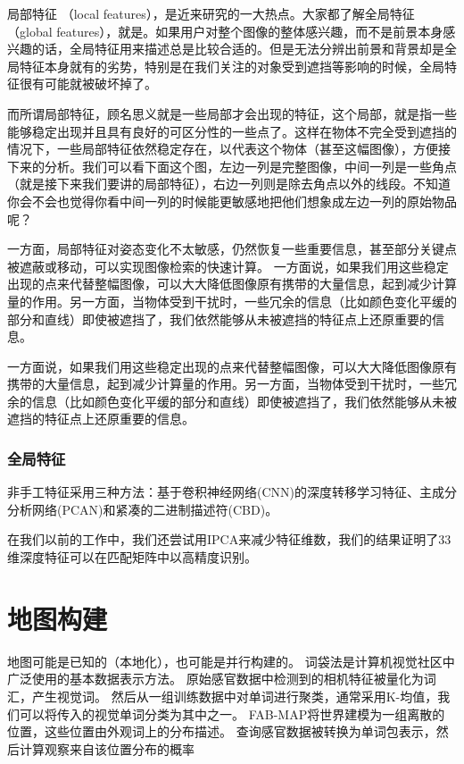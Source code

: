 局部特征 （local features），是近来研究的一大热点。大家都了解全局特征（global features），就是。如果用户对整个图像的整体感兴趣，而不是前景本身感兴趣的话，全局特征用来描述总是比较合适的。但是无法分辨出前景和背景却是全局特征本身就有的劣势，特别是在我们关注的对象受到遮挡等影响的时候，全局特征很有可能就被破坏掉了。


而所谓局部特征，顾名思义就是一些局部才会出现的特征，这个局部，就是指一些能够稳定出现并且具有良好的可区分性的一些点了。这样在物体不完全受到遮挡的情况下，一些局部特征依然稳定存在，以代表这个物体（甚至这幅图像），方便接下来的分析。我们可以看下面这个图，左边一列是完整图像，中间一列是一些角点（就是接下来我们要讲的局部特征），右边一列则是除去角点以外的线段。不知道你会不会也觉得你看中间一列的时候能更敏感地把他们想象成左边一列的原始物品呢？

一方面，局部特征对姿态变化不太敏感，仍然恢复一些重要信息，甚至部分关键点被遮蔽或移动，可以实现图像检索的快速计算。
一方面说，如果我们用这些稳定出现的点来代替整幅图像，可以大大降低图像原有携带的大量信息，起到减少计算量的作用。另一方面，当物体受到干扰时，一些冗余的信息（比如颜色变化平缓的部分和直线）即使被遮挡了，我们依然能够从未被遮挡的特征点上还原重要的信息。


一方面说，如果我们用这些稳定出现的点来代替整幅图像，可以大大降低图像原有携带的大量信息，起到减少计算量的作用。另一方面，当物体受到干扰时，一些冗余的信息（比如颜色变化平缓的部分和直线）即使被遮挡了，我们依然能够从未被遮挡的特征点上还原重要的信息。


\subsubsection{全局特征}
 非手工特征采用三种方法：基于卷积神经网络(CNN)的深度转移学习特征、主成分分析网络(PCAN)和紧凑的二进制描述符(CBD)\cite{nanni2017handcraft}。 

 在我们以前的工作中，我们还尝试用IPCA来减少特征维数\cite{zhang2017Dynamic}，我们的结果证明了33维深度特征可以在匹配矩阵中以高精度识别。


\section{地图构建}
\label{sec:map}

地图可能是已知的（本地化），也可能是并行构建的。 词袋法是计算机视觉社区中广泛使用的基本数据表示方法\cite{Sivic2003Video}。 原始感官数据中检测到的相机特征被量化为词汇，产生视觉词。 然后从一组训练数据中对单词进行聚类，通常采用K-均值，我们可以将传入的视觉单词分类为其中之一。 FAB-MAP\cite{Cummins2008FAB}将世界建模为一组离散的位置，这些位置由外观词上的分布描述。 查询感官数据被转换为单词包表示，然后计算观察来自该位置分布的概率

